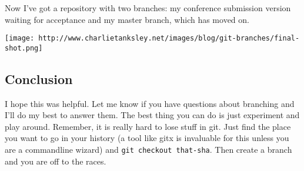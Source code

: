 \documentclass{article}
\begin{document}
Now I've got a repository with two branches: my conference
submission version waiting for acceptance and my master branch,
which has moved on.

\texttt{[image: http://www.charlietanksley.net/images/blog/git-branches/final-shot.png]}

\subsection{Conclusion}

I hope this was helpful. Let me know if you have questions about
branching and I'll do my best to answer them. The best thing you
can do is just experiment and play around. Remember, it is really
hard to lose stuff in git. Just find the place you want to go in
your history (a tool like gitx is invaluable for this unless you
are a commandline wizard) and \verb!git checkout that-sha!. Then
create a branch and you are off to the races.
\end{document}
